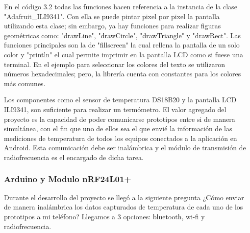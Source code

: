 \par \noindent
En el código 3.2 todas las funciones hacen referencia a la instancia de la clase "Adafruit\_ILI9341". Con ella se puede pintar pixel por pixel la pantalla utilizando esta clase; sin embargo, ya hay funciones para realizar figuras geométricas como: "drawLine", "drawCircle", "drawTriangle" y "drawRect". Las funciones principales son la de "fillscreen" la cual rellena la pantalla de un solo color y "println" el cual permite imprimir en la pantalla LCD como si fuese una terminal. En el ejemplo para seleccionar los colores del texto se utilizaron números hexadecimales; pero, la librería cuenta con constantes para los colores más comunes.

\par \noindent
Los componentes como el sensor de temperatura DS18B20 y la pantalla LCD ILI9341, son suficiente para realizar un termómetro. El valor agregado del proyecto es la capacidad de poder comunicarse prototipos entre si de manera simultánea, con el fin que uno de ellos sea el que envié la información de las mediciones de temperatura de todos los equipos conectados a la aplicación en Android. Esta comunicación debe ser inalámbrica y el módulo de transmisión de radiofrecuencia es el encargado de dicha tarea.

\subsubsection{Arduino y Modulo nRF24L01+}
\par 
Durante el desarrollo del proyecto se llegó a la siguiente pregunta ¿Cómo enviar de manera inalámbrica los datos capturados de temperatura de cada uno de los prototipos a mi teléfono? Llegamos a 3 opciones: bluetooth, wi-fi y radiofrecuencia.


